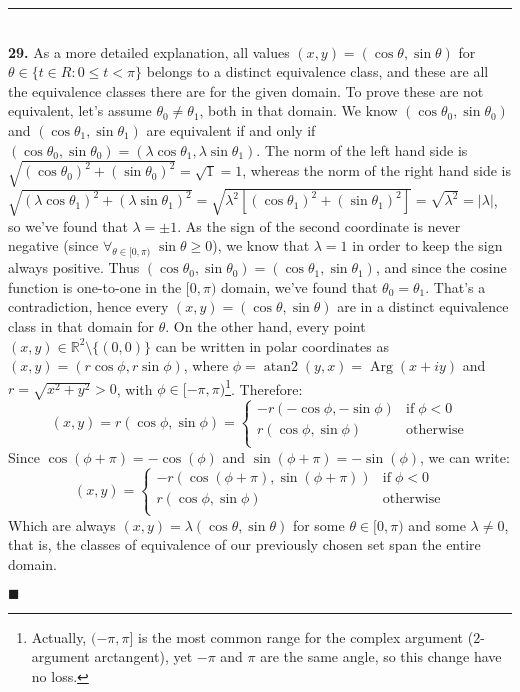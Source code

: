 \documentclass{article}[10pt]
\newenvironment{exercise}[1]
    {\noindent\rule{2cm}{0.4pt} \\
     \textbf{#1.}}
    {}
\newcommand{\qed}{

\hfill\ensuremath{\blacksquare}

}
\begin{document}
\begin{exercise}{29}
  As a more detailed explanation,
  all values $(x, y) = (\cos \theta, \sin \theta)$
  for $\theta \in \{t \in R : 0 \le t < \pi \}$
  belongs to a distinct equivalence class,
  and these are all the equivalence classes there are
  for the given domain.
  To prove these are not equivalent,
  let's assume $\theta_0 \ne \theta_1$, both in that domain.
  We know $(\cos \theta_0, \sin \theta_0)$
  and $(\cos \theta_1, \sin \theta_1)$
  are equivalent if and only if
  $(\cos \theta_0, \sin \theta_0) =
   (\lambda \cos \theta_1, \lambda \sin \theta_1)$.
  The norm of the left hand side is
  $\sqrt{(\cos \theta_0)^2 + (\sin \theta_0)^2} = \sqrt{1} = 1$,
  whereas the norm of the right hand side is
  $\sqrt{(\lambda \cos \theta_1)^2 + (\lambda \sin \theta_1)^2} =
   \sqrt{\lambda^2 \left[ (\cos \theta_1)^2 +
                          (\sin \theta_1)^2 \right] } =
   \sqrt{\lambda^2} = |\lambda|$,
  so we've found that $\lambda = \pm 1$.
  As the sign of the second coordinate is never negative
  (since $\forall_{\theta \in [0, \pi)} \; \sin \theta \ge 0$),
  we know that $\lambda = 1$
  in order to keep the sign always positive.
  Thus $(\cos \theta_0, \sin \theta_0) =
        (\cos \theta_1, \sin \theta_1)$,
  and since the cosine function is one-to-one in the $[0, \pi)$ domain,
  we've found that $\theta_0 = \theta_1$.
  That's a contradiction,
  hence every $(x, y) = (\cos \theta, \sin \theta)$
  are in a distinct equivalence class
  in that domain for $\theta$.
  On the other hand,
  every point $(x, y) \in \mathds{R}^2 \setminus \{(0, 0)\}$
  can be written in polar coordinates as
  $(x, y) = (r \cos \phi, r \sin \phi)$, where
  $\phi = \operatorname{atan2}(y, x) = \operatorname{Arg}(x + i y)$
  and $r = \sqrt{x^2 + y^2} > 0$,
  with $\phi \in [-\pi, \pi)$\footnote{
    Actually, $(-\pi, \pi]$ is the most common range
    for the complex argument ($2$-argument arctangent),
    yet $-\pi$ and $\pi$ are the same angle,
    so this change have no loss.
  }.
  Therefore:
  \[
    (x, y) = r \left( \cos \phi, \sin \phi \right) =
    \begin{cases}
       -r \left(-\cos \phi,
                -\sin \phi \right)
       & \text{if} \; \phi < 0 \\
       r \left( \cos \phi,
                \sin \phi \right)
       & \text{otherwise} \\
    \end{cases}
  \]
  Since $\cos(\phi + \pi) = -\cos(\phi)$
  and $\sin(\phi + \pi) = -\sin(\phi)$,
  we can write:
  \[
    (x, y) =
    \begin{cases}
       -r \left(\cos(\phi + \pi),
                \sin(\phi + \pi) \right)
       & \text{if} \; \phi < 0 \\
       r \left( \cos \phi,
                \sin \phi \right)
       & \text{otherwise} \\
    \end{cases}
  \]
  Which are always $(x, y) = \lambda (\cos \theta, \sin \theta)$
  for some $\theta \in [0, \pi)$
  and some $\lambda \ne 0$,
  that is, the classes of equivalence
  of our previously chosen set
  span the entire domain.
  \qed
\end{exercise}
\end{document}
